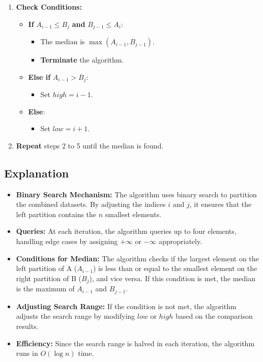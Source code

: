 \documentclass[10pt,letter,notitlepage]{article}
\begin{document}
\begin{Answer}
\begin{enumerate}
    \item \textbf{Check Conditions:}
    \begin{itemize}
        \item \textbf{If} $A_{i-1} \leq B_j$ \textbf{and} $B_{j-1} \leq A_i$:
        \begin{itemize}
            \item The median is $\max(A_{i-1}, B_{j-1})$.
            \item \textbf{Terminate} the algorithm.
        \end{itemize}
        \item \textbf{Else if} $A_{i-1} > B_j$:
        \begin{itemize}
            \item Set $high = i - 1$.
        \end{itemize}
        \item \textbf{Else}:
        \begin{itemize}
            \item Set $low = i + 1$.
        \end{itemize}
    \end{itemize}
    
    \item \textbf{Repeat} steps 2 to 5 until the median is found.
\end{enumerate}

\subsection*{Explanation}

\begin{itemize}
    \item \textbf{Binary Search Mechanism:} The algorithm uses binary search to partition the combined datasets. By adjusting the indices $i$ and $j$, it ensures that the left partition contains the $n$ smallest elements.
    \item \textbf{Queries:} At each iteration, the algorithm queries up to four elements, handling edge cases by assigning $+\infty$ or $-\infty$ appropriately.
    \item \textbf{Conditions for Median:} The algorithm checks if the largest element on the left partition of A ($A_{i-1}$) is less than or equal to the smallest element on the right partition of B ($B_j$), and vice versa. If this condition is met, the median is the maximum of $A_{i-1}$ and $B_{j-1}$.
    \item \textbf{Adjusting Search Range:} If the condition is not met, the algorithm adjusts the search range by modifying $low$ or $high$ based on the comparison results.
    \item \textbf{Efficiency:} Since the search range is halved in each iteration, the algorithm runs in $O(\log n)$ time.
\end{itemize}


\end{Answer}
\end{document}

